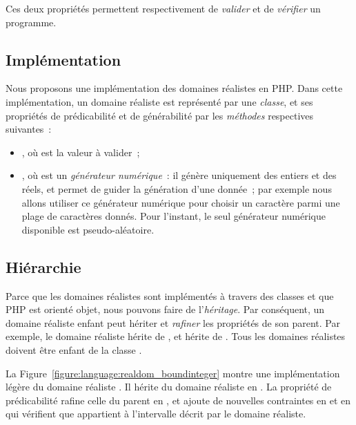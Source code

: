 Ces deux propriétés permettent respectivement de {\em valider} et de {\em
vérifier} un programme.

\subsection{Implémentation}
\label{subsection:language:realdom:implementation}

Nous proposons une implémentation des domaines réalistes en PHP. Dans cette
implémentation, un domaine réaliste est représenté par une {\em classe}, et ses
propriétés de prédicabilité et de générabilité par les {\em méthodes}
respectives suivantes~:

\begin{itemize}

\item {}, où  est la valeur à valider~;

\item {}, où  est un {\em générateur
numérique}~: il génère uniquement des entiers et des réels, et permet de guider
la génération d'une donnée~; par exemple nous allons utiliser ce générateur
numérique pour choisir un caractère parmi une plage de caractères donnés.  Pour
l'instant, le seul générateur numérique disponible est pseudo-aléatoire.

\end{itemize}

\subsection{Hiérarchie}
\label{subsection:language:realdom:hierarchy}

Parce que les domaines réalistes sont implémentés à travers des classes et que
PHP est orienté objet, nous pouvons faire de l'{\em héritage}. Par conséquent,
un domaine réaliste enfant peut hériter et {\em rafiner} les propriétés de son
parent. Par exemple, le domaine réaliste  hérite de ,
et  hérite de . Tous les domaines réalistes
doivent être enfant de la classe .

La Figure~\ref{figure:language:realdom_boundinteger} montre une implémentation
légère du domaine réaliste . Il hérite du domaine réaliste
 en . La propriété de prédicabilité rafine celle du
parent en , et ajoute de nouvelles contraintes en  et en
 qui vérifient que  appartient à l'intervalle décrit par le
domaine réaliste.

